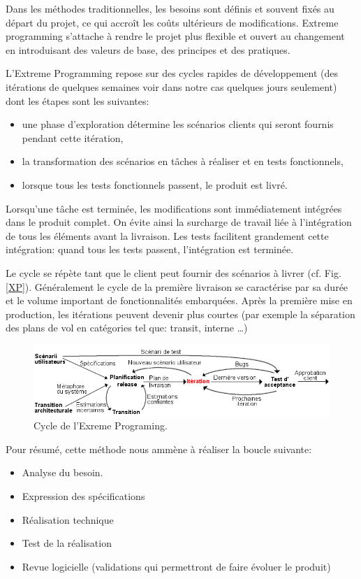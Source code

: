 Dans les méthodes traditionnelles, les besoins sont définis et souvent fixés au départ du projet, ce qui accroît les coûts ultérieurs de modifications. Extreme programming s'attache à rendre le projet plus flexible et ouvert au changement en introduisant des valeurs de base, des principes et des pratiques.

L'Extreme Programming repose sur des cycles rapides de développement (des itérations de quelques semaines voir dans notre cas quelques jours seulement) dont les étapes sont les suivantes:
\begin{itemize}
\item une phase d'exploration détermine les scénarios clients qui seront fournis pendant cette itération,
\item la transformation des scénarios en tâches à réaliser et en tests fonctionnels,
\item lorsque tous les tests fonctionnels passent, le produit est livré.
\end{itemize}\medskip

Lorsqu'une tâche est terminée, les modifications sont immédiatement intégrées dans le produit complet. On évite ainsi la surcharge de travail liée à l'intégration de tous les éléments avant la livraison. Les tests facilitent grandement cette intégration: quand tous les tests passent, l'intégration est terminée.

Le cycle se répète tant que le client peut fournir des scénarios à livrer (cf. Fig. \vref{XP}). Généralement le cycle de la première livraison se caractérise par sa durée et le volume important de fonctionnalités embarquées. Après la première mise en production, les itérations peuvent devenir plus courtes (par exemple la séparation des plans de vol en catégories tel que: transit, interne …)
\begin{figure}
\center
\includegraphics[width=15cm]{images/xp.png}
\caption{Cycle de l'Exreme Programing.}
\label{XP}
\end{figure}

Pour résumé, cette méthode nous ammène à réaliser la boucle suivante:
\begin{itemize}
\item Analyse du besoin.
\item Expression des spécifications
\item Réalisation technique
\item Test de la réalisation
\item Revue logicielle (validations qui permettront de faire évoluer le produit)
\end{itemize}\medskip

